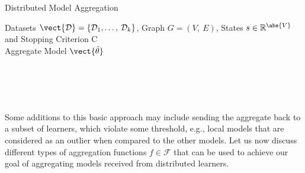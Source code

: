 \begin{algo}{Distributed Model Aggregation}
    \begin{algorithm}[H]
    \caption[Distributed Learning with PGMs]{General approach to distributed learning. While the stopping criterion $C$ has not been fulfilled, the distributed learners update the observed data in each round and train a new or updated model. Afterward, the local parameters are sent to the coordinator and aggregated with some aggregation algorithm.}
        \begin{algorithmic}[1]
            \label{alg:magg}
            \REQUIRE Datasets $\mathcal{\vect{D}} = \{\mathcal{D}_1, \ldots,\: \mathcal{D}_k\}$, Graph $G=(V,\:E)$, States $s \in \mathbb{R}^{\abs{V}}$ and Stopping Criterion C \\
            \ENSURE Aggregate Model $\vect{\tilde{\theta}}$  \\
             \\
             \\
            \\
                 \\
            \ENDIF
            \ENDWHILE
            \RETURN {$\vect{\tilde{\theta}}$}
        \end{algorithmic}
    \end{algorithm}
\end{algo}
Some additions to this basic approach may include sending the aggregate back to a subset of learners, which violate some threshold, e.g., local models that are considered as an outlier when compared to the other models.
Let us now discuss different types of aggregation functions $f \in \mathcal{F}$ that can be used to achieve our goal of aggregating models received from distributed learners.

